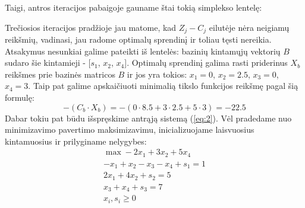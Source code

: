 \documentclass{article}
\begin{document}
Taigi, antros iteracijos pabaigoje gauname štai tokią simplekso lentelę:
\begin{table}[H]
    \centering
    \caption{Simplekso lentelė pirmos iteracijos pabaigoje}
    \label{table:3}
\end{table}
Trečiosios iteracijos pradžioje jau matome, kad $Z_j-C_j$ eilutėje nėra neigiamų reikšmių, vadinasi, jau radome optimalų sprendinį ir toliau tęsti nereikia. Atsakymus nesunkiai galime pateikti iš lentelės: bazinių kintamųjų vektorių $B$ sudaro šie kintamieji - [$s_1$, $x_2$, $x_4$]. Optimalų sprendinį galima rasti priderinus $X_b$ reikšmes prie bazinės matricos $B$ ir jos yra tokios: $x_1=0$, $x_2=2.5$, $x_3=0$, $x_4=3$. Taip pat galime apskaičiuoti minimalią tikslo funkcijos reikšmę pagal šią formulę:
\begin{equation*}
    -(C_b\cdot X_b) = -(0\cdot8.5+3\cdot2.5+5\cdot3) = -22.5
\end{equation*}
Dabar tokiu pat būdu išspręskime antrąją sistemą (\ref{eq:2}). Vėl pradedame nuo minimizavimo pavertimo maksimizavimu, inicializuojame laisvuosius kintamuosius ir prilyginame nelygybes:
\begin{equation*}
    \begin{split}
        \max -2x_{1}+3x_{2}+5x_{4} \\
        -x_{1}+x_{2}-x_{3}-x_{4}+s_1=1\\
        2x_{1}+4x_{2}+s_2=5\\
        x_{3}+x_{4}+s_3=7\\
        x_{i}, s_{i}\geq0
    \end{split}
\end{equation*}
\end{document}
